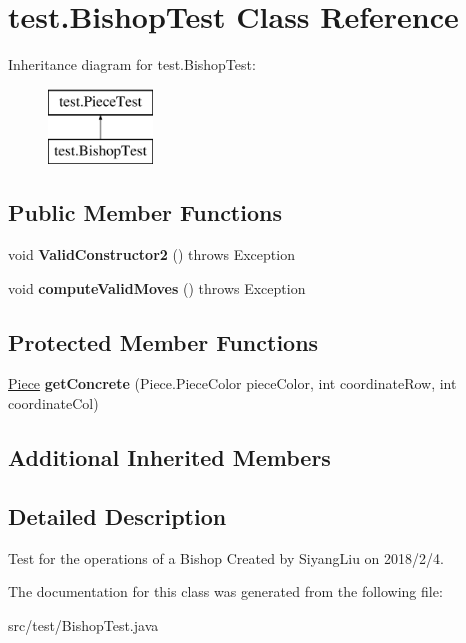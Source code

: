 \hypertarget{classtest_1_1_bishop_test}{}\section{test.\+Bishop\+Test Class Reference}
\label{classtest_1_1_bishop_test}
Inheritance diagram for test.\+Bishop\+Test\+:\begin{figure}[H]
\begin{center}
\leavevmode
\includegraphics[height=2.000000cm]{classtest_1_1_bishop_test}
\end{center}
\end{figure}
\subsection*{Public Member Functions}
\begin{DoxyCompactItemize}
\item 
\mbox{\label{classtest_1_1_bishop_test_afe24c52797af2017636f5b4281c9dbfa}} 
void {\bfseries Valid\+Constructor2} ()  throws Exception 
\item 
\mbox{\label{classtest_1_1_bishop_test_a105307f417e76a95ff538113c10f51ce}} 
void {\bfseries compute\+Valid\+Moves} ()  throws Exception 
\end{DoxyCompactItemize}
\subsection*{Protected Member Functions}
\begin{DoxyCompactItemize}
\item 
\mbox{\label{classtest_1_1_bishop_test_a60e61e7acbe7fa0265a4404f2e0f7fd2}} 
\mbox{\hyperlink{classpieces_1_1_piece}{Piece}} {\bfseries get\+Concrete} (Piece.\+Piece\+Color piece\+Color, int coordinate\+Row, int coordinate\+Col)
\end{DoxyCompactItemize}
\subsection*{Additional Inherited Members}


\subsection{Detailed Description}
Test for the operations of a Bishop Created by Siyang\+Liu on 2018/2/4. 

The documentation for this class was generated from the following file\+:\begin{DoxyCompactItemize}
\item 
src/test/Bishop\+Test.\+java\end{DoxyCompactItemize}
